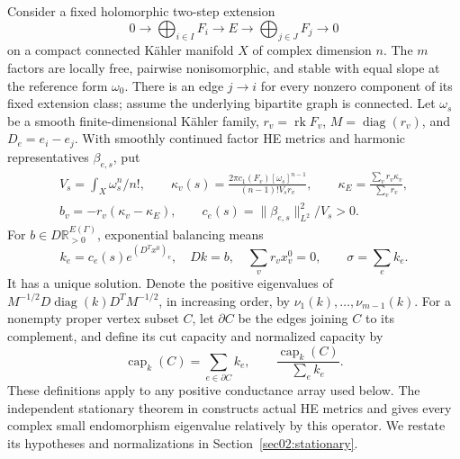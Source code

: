 \documentclass[11pt]{amsart}
\theoremstyle{definition}
\theoremstyle{remark}
\newcommand{\RR}{\mathbb R}
\newcommand{\rk}{\operatorname{rk}}
\newcommand{\diag}{\operatorname{diag}}
\begin{document}
Consider a fixed holomorphic two-step extension
\[
 0\longrightarrow\bigoplus_{i\in I}F_i\longrightarrow E
     \longrightarrow\bigoplus_{j\in J}F_j\longrightarrow0
\]
on a compact connected Kähler manifold \(X\) of complex dimension
\(n\). The \(m\) factors are
locally free, pairwise nonisomorphic, and stable with equal slope
at the reference form \(\omega_0\). There is an edge \(j\to i\)
for every nonzero component of its fixed extension class; assume
the underlying bipartite graph is connected. Let \(\omega_s\)
be a smooth finite-dimensional Kähler family, \(r_v=\rk F_v\),
\(M=\diag(r_v)\), and \(D_e=e_i-e_j\). With smoothly continued
factor HE metrics and harmonic representatives \(\beta_{e,s}\), put
\begin{equation}\label{eq01:data}
 \begin{gathered}
 V_s=\int_X\omega_s^n/n!,\qquad
 \kappa_v(s)=\frac{2\pi c_1(F_v)[\omega_s]^{n-1}}
                  {(n-1)!V_sr_v},\qquad
 \kappa_E=\frac{\sum_vr_v\kappa_v}{\sum_vr_v},\\
 b_v=-r_v(\kappa_v-\kappa_E),\qquad
 c_e(s)=\|\beta_{e,s}\|_{L^2}^2/V_s>0.
 \end{gathered}
\end{equation}
For \(b\in D\RR_{>0}^{E(\Gamma)}\), exponential balancing means
\begin{equation}\label{eq01:balance}
 k_e=c_e(s)e^{(D^Tx^0)_e},\quad Dk=b,\quad
 \sum_vr_vx_v^0=0,\qquad\sigma=\sum_ek_e.
\end{equation}
It has a unique solution. Denote the positive eigenvalues of
\(M^{-1/2}D\diag(k)D^TM^{-1/2}\), in increasing order, by
\(\nu_1(k),\ldots,\nu_{m-1}(k)\).
For a nonempty proper vertex subset \(C\), let \(\partial C\)
be the edges joining \(C\) to its complement, and define its
cut capacity and normalized capacity by
\[
 \operatorname{cap}_k(C)=\sum_{e\in\partial C}k_e,\qquad
 \frac{\operatorname{cap}_k(C)}{\sum_ek_e}.
\]
These definitions apply to any positive conductance array used below.
The independent stationary theorem in \cite{wuebben2026uniform}
constructs actual HE metrics and gives every complex small
endomorphism eigenvalue relatively by this operator. We restate
its hypotheses and normalizations in Section~\ref{sec02:stationary}.
\end{document}
